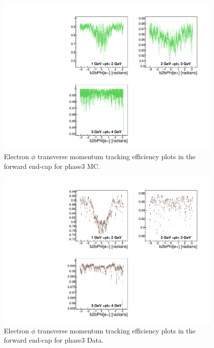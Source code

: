 \documentclass[a4paper,11pt,twosided,final,german,openbib,pdftex,listof=totoc,bibliography=totoc]{scrbook}
\begin{document}
\begin{appendix}
\begin{figure}[!htbp]
	\centering
	\includegraphics[width=\textwidth]{Plots/master3/xPtMPhiemFC_MCP3}
	\caption[Transverse Momentum $\phi$ Electron Forward End-Cap Efficiency Phase3 MC]{Electron $\phi$ transverse momentum tracking efficiency plots in the forward end-cap for phase3 MC.}
	\label{plt:PtMPhiemFC3_MC}
\end{figure}


\begin{figure}[!htbp]
	\centering
	\includegraphics[width=\textwidth]{Plots/master3/xPtMPhiemFC_DataP3}
	\caption[Transverse Momentum $\phi$ Electron Forward End-Cap Efficiency Phase3 Data]{Electron $\phi$ transverse momentum tracking efficiency plots in the forward end-cap for phase3 Data.}
	\label{plt:PtMPhiemFC3_Data}
\end{figure}



\end{appendix}
\end{document}
